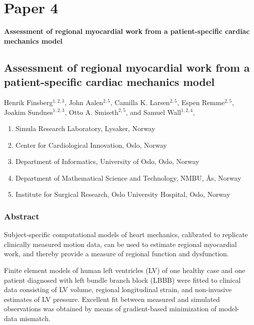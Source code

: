 


\graphicspath{{chapters/paper4/}}


\chapter{Paper 4}
{\Huge \textbf{Assessment of regional myocardial work from a patient-specific
  cardiac mechanics model}}

\newpage
\section*{Assessment of regional myocardial work from a patient-specific
  cardiac mechanics model}

  Henrik Finsberg$^{1,2,3}$,
  John Aalen$^{2,5}$,
  Camilla K. Larsen$^{2,5}$,
  Espen Remme$^{2,5}$,
  Joakim Sundnes$^{1,2,3}$,
  Otto A. Smiseth$^{2,5}$, and
  Samuel Wall$^{1,2,4}$,

\footnotesize
\begin{enumerate}[itemsep=-2mm]
\item{Simula Research Laboratory, Lysaker, Norway}
\item{Center for Cardiological Innovation, Oslo, Norway}
\item{Department of Informatics, University of Oslo, Oslo, Norway}
\item{Department of Mathematical Science and Technology, NMBU, \r{A}s,
    Norway}
\item{Institute for Surgical Research, Oslo University Hospital, Oslo,
    Norway} 
\end{enumerate}
\normalsize
 

\subsection*{Abstract}
  Subject-specific computational models of heart mechanics, calibrated
  to replicate clinically measured motion data, can be used to
  estimate regional myocardial work, and thereby provide a measure of
  regional function and dysfunction.

  Finite element models of human left ventricles (LV) of one healthy
  case and one patient diagnosed with left bundle branch block (LBBB)
  were fitted to clinical data consisting of LV volume, regional
  longitudinal strain, and non-invasive estimates of LV pressure. Excellent
  fit between measured and simulated observations was obtained by means
  of gradient-based minimization of model-data mismatch.
  
